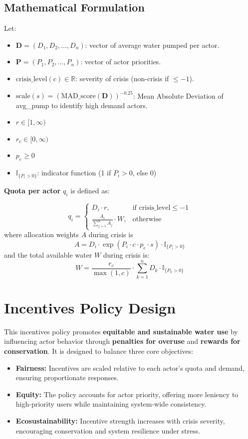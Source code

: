 \documentclass[a4paper, 12pt]{article}
\begin{document}
\subsection{Mathematical Formulation}
Let:
\begin{itemize}
  \item $\mathbf{D} = (D_1, D_2, \dots, D_n)$: vector of average water pumped per actor.
  \item $\mathbf{P} = (P_1, P_2, \dots, P_n)$: vector of actor priorities.
  \item $\text{crisis\_level}(c) \in \mathbb{R}$: severity of crisis (non-crisis if $\leq -1$).
  \item $\mathrm{scale}(s) = \left( \mathrm{MAD\_score}(\mathbf{D}) \right)^{-0.25}$: Mean Absolute Deviation of avg\_pump to identify high demand actors.
  \item $ r \in [1, \infty)$
  \item $r_c \in [0, \infty)$
  \item $p_e \geq 0$
  \item $\mathbb{I}_{\{P_i > 0\}}$: indicator function (1 if $P_i > 0$, else 0)
\end{itemize}

\textbf{Quota per actor} $q_i$ is defined as:

\[
q_i =
\begin{cases}
D_i \cdot r, & \text{if } \text{crisis\_level} \leq -1 \\[12pt]
\displaystyle
\frac{A_i}
{\sum\limits_{j=1}^n A_j}
\cdot W, & \text{otherwise}

\end{cases}
\]
where allocation weights $A$ during crisis is
\[
A = D_i \cdot \exp\left(P_i \cdot c \cdot p_e \cdot s \right) \cdot \mathbb{I}_{\{P_i > 0\}}
\]
and the total available water $W$ during crisis is:
\[
W = \frac{r_c}{\max(1, c)} \cdot \sum_{k=1}^n D_k \cdot \mathbb{I}_{\{P_k > 0\}}
\]

\section{Incentives Policy Design}
This incentives policy promotes \textbf{equitable and sustainable water use} by influencing actor behavior 
through \textbf{penalties for overuse} and \textbf{rewards for conservation}. It is designed to balance three core objectives:

\begin{itemize}
    \item \textbf{Fairness:} Incentives are scaled relative to each actor’s quota and demand, ensuring proportionate responses.
    \item \textbf{Equity:} The policy accounts for actor priority, offering more leniency to high-priority users while maintaining system-wide consistency.
    \item \textbf{Ecosustainability:} Incentive strength increases with crisis severity, encouraging conservation and system resilience under stress.
\end{itemize}
\end{document}
